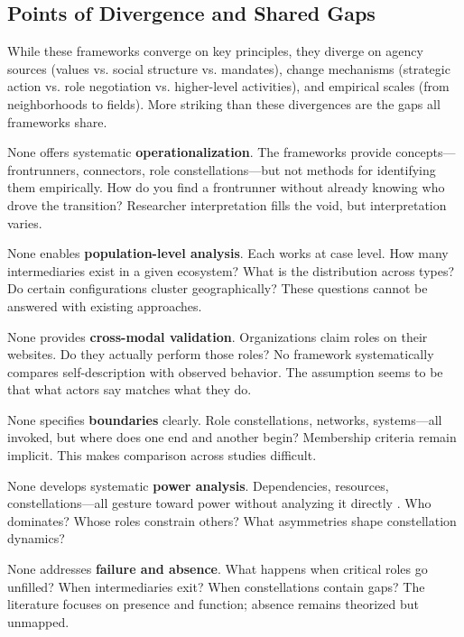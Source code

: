 \documentclass[../main.tex]{subfiles}
\begin{document}
\subsection{Points of Divergence and Shared Gaps}

While these frameworks converge on key principles, they diverge on agency sources (values vs. social structure vs. mandates), change mechanisms (strategic action vs. role negotiation vs. higher-level activities), and empirical scales (from neighborhoods to fields). More striking than these divergences are the gaps all frameworks share.

None offers systematic \textbf{operationalization}. The frameworks provide concepts---frontrunners, connectors, role constellations---but not methods for identifying them empirically. How do you find a frontrunner without already knowing who drove the transition? Researcher interpretation fills the void, but interpretation varies.

None enables \textbf{population-level analysis}. Each works at case level. How many intermediaries exist in a given ecosystem? What is the distribution across types? Do certain configurations cluster geographically? These questions cannot be answered with existing approaches.

None provides \textbf{cross-modal validation}. Organizations claim roles on their websites. Do they actually perform those roles? No framework systematically compares self-description with observed behavior. The assumption seems to be that what actors say matches what they do.

None specifies \textbf{boundaries} clearly. Role constellations, networks, systems---all invoked, but where does one end and another begin? Membership criteria remain implicit. This makes comparison across studies difficult.

None develops systematic \textbf{power analysis}. Dependencies, resources, constellations---all gesture toward power without analyzing it directly \cite{avelino2024just}. Who dominates? Whose roles constrain others? What asymmetries shape constellation dynamics?

None addresses \textbf{failure and absence}. What happens when critical roles go unfilled? When intermediaries exit? When constellations contain gaps? The literature focuses on presence and function; absence remains theorized but unmapped.
\end{document}
